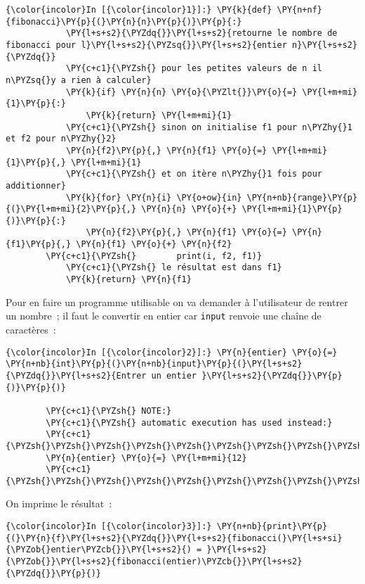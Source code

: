     \begin{Verbatim}[commandchars=\\\{\}]
{\color{incolor}In [{\color{incolor}1}]:} \PY{k}{def} \PY{n+nf}{fibonacci}\PY{p}{(}\PY{n}{n}\PY{p}{)}\PY{p}{:}
            \PY{l+s+s2}{\PYZdq{}}\PY{l+s+s2}{retourne le nombre de fibonacci pour l}\PY{l+s+s2}{\PYZsq{}}\PY{l+s+s2}{entier n}\PY{l+s+s2}{\PYZdq{}}
            \PY{c+c1}{\PYZsh{} pour les petites valeurs de n il n\PYZsq{}y a rien à calculer}
            \PY{k}{if} \PY{n}{n} \PY{o}{\PYZlt{}}\PY{o}{=} \PY{l+m+mi}{1}\PY{p}{:}
                \PY{k}{return} \PY{l+m+mi}{1}
            \PY{c+c1}{\PYZsh{} sinon on initialise f1 pour n\PYZhy{}1 et f2 pour n\PYZhy{}2}
            \PY{n}{f2}\PY{p}{,} \PY{n}{f1} \PY{o}{=} \PY{l+m+mi}{1}\PY{p}{,} \PY{l+m+mi}{1}
            \PY{c+c1}{\PYZsh{} et on itère n\PYZhy{}1 fois pour additionner}
            \PY{k}{for} \PY{n}{i} \PY{o+ow}{in} \PY{n+nb}{range}\PY{p}{(}\PY{l+m+mi}{2}\PY{p}{,} \PY{n}{n} \PY{o}{+} \PY{l+m+mi}{1}\PY{p}{)}\PY{p}{:}
                \PY{n}{f2}\PY{p}{,} \PY{n}{f1} \PY{o}{=} \PY{n}{f1}\PY{p}{,} \PY{n}{f1} \PY{o}{+} \PY{n}{f2}
        \PY{c+c1}{\PYZsh{}        print(i, f2, f1)}
            \PY{c+c1}{\PYZsh{} le résultat est dans f1}
            \PY{k}{return} \PY{n}{f1}
\end{Verbatim}


    Pour en faire un programme utilisable on va demander à l'utilisateur de
rentrer un nombre~; il faut le convertir en entier car \texttt{input}
renvoie une chaîne de caractères~:

    \begin{Verbatim}[commandchars=\\\{\}]
{\color{incolor}In [{\color{incolor}2}]:} \PY{n}{entier} \PY{o}{=} \PY{n+nb}{int}\PY{p}{(}\PY{n+nb}{input}\PY{p}{(}\PY{l+s+s2}{\PYZdq{}}\PY{l+s+s2}{Entrer un entier }\PY{l+s+s2}{\PYZdq{}}\PY{p}{)}\PY{p}{)}
        
        \PY{c+c1}{\PYZsh{} NOTE:}
        \PY{c+c1}{\PYZsh{} automatic execution has used instead:}
        \PY{c+c1}{\PYZsh{}\PYZsh{}\PYZsh{}\PYZsh{}\PYZsh{}\PYZsh{}\PYZsh{}\PYZsh{}\PYZsh{}\PYZsh{}}
        \PY{n}{entier} \PY{o}{=} \PY{l+m+mi}{12}
        \PY{c+c1}{\PYZsh{}\PYZsh{}\PYZsh{}\PYZsh{}\PYZsh{}\PYZsh{}\PYZsh{}\PYZsh{}\PYZsh{}\PYZsh{}}
\end{Verbatim}


    On imprime le résultat~:

    \begin{Verbatim}[commandchars=\\\{\}]
{\color{incolor}In [{\color{incolor}3}]:} \PY{n+nb}{print}\PY{p}{(}\PY{n}{f}\PY{l+s+s2}{\PYZdq{}}\PY{l+s+s2}{fibonacci(}\PY{l+s+si}{\PYZob{}entier\PYZcb{}}\PY{l+s+s2}{) = }\PY{l+s+s2}{\PYZob{}}\PY{l+s+s2}{fibonacci(entier)\PYZcb{}}\PY{l+s+s2}{\PYZdq{}}\PY{p}{)}
\end{Verbatim}


